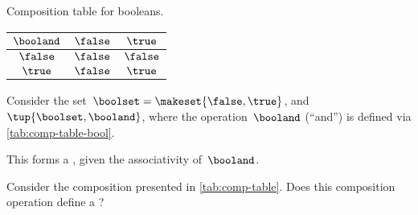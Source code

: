 \begin{margintable}
    \caption{Composition table for booleans.}
    \label{tab:comp-table-bool}
    \centering
    \begin{tabular}{c|cc}
        $\booland$ & $\false$ & $\true$ \\
        \hline
        $\false$   & $\false$ & $\false$ \\
        $\true$    & $\false$ & $\true$
    \end{tabular}
\end{margintable}

\begin{example}[Booleans]
    \label{exa:booleans-table}
    \label{ex:bool_semigroup}
    Consider the set~$\boolset=\makeset{\false, \true}$, and~$\tup{\boolset,\booland}$, where the operation~$\booland$ (``and'') is defined via \cref{tab:comp-table-bool}.

    This forms a , given the associativity of~$\booland$.
\end{example}

\begin{gradedexercise}
    \label{ex:CompositionTable}
    Consider the composition presented in \cref{tab:comp-table}.
    Does this composition operation define a ?
\end{gradedexercise}

